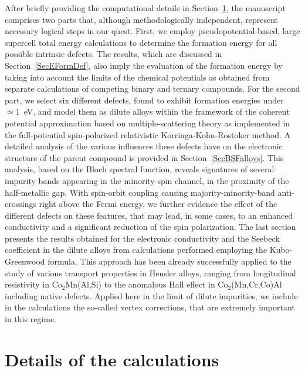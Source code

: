 \documentclass[aps,prb,twocolumn,superscriptaddress,showpacs]{revtex4}
\begin{document}
After briefly providing the computational details in 
Section~\ref{SecCompute}, the manuscript comprises two parts
that, although methodologically independent, represent
necessary logical steps in our quest. 
First, we employ pseudopotential-based,
large supercell total energy calculations
to determine the formation energy\cite{VdWN04,ZWZ97,SDM16} for
all possible intrinsic defects. The results, which are
discussed in Section~\ref{SecEFormDef}, also imply
the evaluation of the formation energy by taking
into account the limits of the chemical potentials as obtained from
separate calculations of competing binary and ternary compounds. 
For the second part, we select six different defects, found to 
exhibit formation energies under $\simeq 1$~eV, and 
model them as dilute alloys within the framework of the
coherent potential approximation\cite{Sov67,Tay67,Sov70} 
based on multiple-scattering theory as implemented in the 
full-potential spin-polarized relativistic Korringa-Kohn-Rostoker
method.\cite{EKM11,EBKM16,SPR-KKR} 
A detailed analysis of the various influences these
defects have on the electronic structure of the parent compound is
provided in Section~\ref{SecBSFalloys}. This analysis,
based on the Bloch spectral function, reveals signatures of
several impurity bands appearing in the minority-spin channel,
in the proximity of the half-metallic gap. With spin-orbit
coupling causing majority-minority-band anti-crossings 
right above the Fermi energy, we further evidence the
effect of the different defects on these features, that
may lead, in some cases, to an enhanced conductivity
and a significant reduction of the spin polarization.
The last section presents the results obtained for the
electronic conductivity and the Seebeck coefficient in
the dilute alloys from calculations performed employing
the Kubo-Greenwood formula.\cite{But85,BEV87}
This approach has been already successfully applied
to the study of various transport properties in Heusler
alloys, ranging from longitudinal 
resistivity in Co$_2$Mn(Al,Si)\cite{KTS10}
to the anomalous Hall effect in Co$_2$(Mn,Cr,Co)Al including
native defects.\cite{KDT13}
Applied here in the limit of dilute impurities, we include
in the calculations the so-called vertex corrections,\cite{But85} 
that are extremely important in this regime. 

\section{Details of the calculations}\label{SecCompute}
\end{document}
